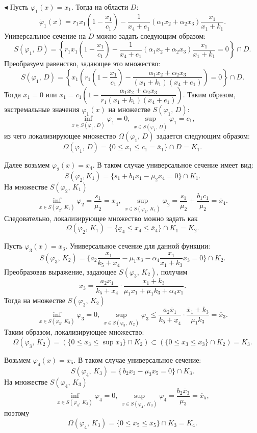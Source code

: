 \documentclass[12pt,a4paper]{extarticle}
\renewenvironment{proof}{\noindent$\blacktriangleleft$}{}
\theoremstyle{definition}
\theoremstyle{definition}
\theoremstyle{definition}
\begin{document}
	\begin{proof} 
		Пусть $\varphi_1(x)=x_1$. Тогда на области $D$:
		\[\dot{\varphi}_1(x)=r_1x_1\left(1-\dfrac{x_1}{c_1}\right)-\dfrac{1}{x_4+e_1}(\alpha_1x_2+\alpha_2x_3)\dfrac{x_1}{x_1+k_1}.\]
		Универсальное сечение на $D$ можно задать следующим образом:
		\[S(\varphi_1,\, D)=\left\{r_1x_1\left(1-\dfrac{x_1}{c_1}\right)-\dfrac{1}{x_4+e_1}(\alpha_1x_2+\alpha_2x_3)\dfrac{x_1}{x_1+k_1}=0\right\}\cap D.\]
		Преобразуем равенство, задающее это множество:
		\[S(\varphi_1,\, D)=\left\{x_1\left(r_1\left(1-\dfrac{x_1}{c_1}\right)-\dfrac{\alpha_1x_2+\alpha_2x_3}{(x_1+k_1)(x_4+e_1)}\right)=0\right\}\cap D.\]
		Тогда $x_1=0$ или $x_1=c_1\left(1-\dfrac{\alpha_1x_2+\alpha_2x_3}{r_1(x_1+k_1)(x_4+e_1)}\right) $. Таким образом, экстремальные значения $\varphi_1(x)$ на множестве $S(\varphi_1,\, D)$:
		\[\inf\limits_{x\in S(\varphi_1,\, D)} \varphi_1=0,\, \sup\limits_{x\in S(\varphi_1,\, D)} \varphi_1=c_1,\]
		из чего локализирующее множество $\Omega(\varphi_1,\, D)$ задается следующим образом:
		\[\Omega(\varphi_1,\, D)=\{0\le x_1\le c_1 = \overline{x}_1\}\cap D=K_1.\]
		
		Далее возьмем $\varphi_2(x)=x_4$. В таком случае универсальное сечение имеет вид:
		\[S(\varphi_2, K_1)=\{s_1 + b_1x_1-\mu_2x_4=0\}\cap K_1.\]
		На множестве $S(\varphi_2,\, K_1)$
		\[\inf\limits_{x\in S(\varphi_2,\, K_1)} \varphi_2=\dfrac{s_1}{\mu_2} = \underline{x}_4,\, \sup\limits_{x\in S(\varphi_2,\, K_1)} \varphi_2=\dfrac{s_1}{\mu_2}+\dfrac{b_1c_1}{\mu_2} = \overline{x}_4.\]
		Следовательно, локализирующее множество можно задать как 
		\[\Omega(\varphi_2,\, K_1)=\{\underline{x}_4 \le x_4\le \overline{x}_4\}\cap K_1=K_2.\]
		
		Пусть $\varphi_3(x)=x_3$. Универсальное сечение для данной функции:
		\[S(\varphi_3,\, K_2)=\{a_2\dfrac{x_1}{k_5+x_4}-\mu_1x_3-\alpha_4\dfrac{x_1}{x_1+k_3}x_3=0\}\cap K_2.\]
		Преобразовав выражение, задающее $S(\varphi_3,\, K_2)$, получим
		\[x_3=\dfrac{a_2x_1}{k_5+x_4}\cdot\dfrac{x_1+k_3}{\mu_1x_1+\mu_1k_3+\alpha_4x_1}.\]
		Тогда на множестве $S(\varphi_3,\, K_2)$
		\[\inf\limits_{x\in S(\varphi_3,\, K_2)} \varphi_3=0,\, \sup\limits_{x\in S(\varphi_3,\, K_2)} \varphi_3\le \dfrac{a_2\overline{x}_1}{k_5+\underline{x}_4}\cdot\dfrac{\overline{x}_1+k_3}{\mu_1k_3}=\overline{x}_3.\]
		Таким образом, локализирующее множество:
		\[\Omega(\varphi_3,\, K_2) = (\{0\le x_3 \le \sup{x_3}\}\cap K_2) \subset (\{0 \le x_3\le \overline x_3\} \cap K_2) = K_3.\]
		
		Возьмем $\varphi_4(x)=x_5$. В таком случае универсальное сечение:
		\[S(\varphi_4,\, K_3)=\{\, b_2x_3-\mu_3x_5=0\}\cap K_3.\]
		На множестве $S(\varphi_4,\, K_3)$
		\[\inf\limits_{x\in S(\varphi_4,\, K_3)} \varphi_4=0,\, \sup\limits_{x\in S(\varphi_4,\, K_3)} \varphi_4=\dfrac{b_2\overline{x}_3}{\mu_3}=\overline{x}_5,\]
		поэтому 
		\[\Omega(\varphi_4,\, K_3) = \{0 \le x_5 \le \overline{x}_5\} \cap K_3 = K_4.\]
		

\end{proof}
\end{document}
